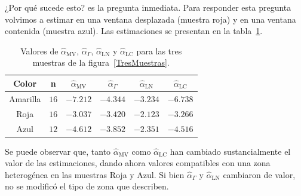 ¿Por qué sucede esto? es la pregunta inmediata. Para responder esta pregunta volvimos a estimar en una ventana desplazada (muestra roja) y en una ventana contenida (muestra azul). Las estimaciones se presentan en la tabla~\ref{TablaTresMuestras}.

\begin{table}[htb]
	\centering
	\caption{\label{TablaTresMuestras} Valores de $\widehat{\alpha}_{\text{MV}}$, $\widehat{\alpha}_{\Gamma}$, $\widehat{\alpha}_{\text{LN}}$ y $\widehat{\alpha}_{\text{LC}}$ para las tres muestras de la figura~\ref{TresMuestras}.}
	\begin{tabular}{c*5{c}}
		\toprule
		Color       &  n    &  $\widehat{\alpha}_{\text{MV}}$    &  $\widehat{\alpha}_{\Gamma}$  &  $\widehat{\alpha}_{\text{LN}}$ &  $\widehat{\alpha}_{\text{LC}}$\\
		\midrule
		Amarilla    & $16$  & $-7.212$ & $-4.344$ & $-3.234$ & $-6.738$\\
		Roja        & $16$  & $-3.037$ & $-3.420$ & $-2.123$ & $-3.266$\\
		Azul        & $12$  & $-4.612$ & $-3.852$ & $-2.351$ & $-4.516$\\
		\bottomrule
	\end{tabular}
\end{table}

Se puede observar que, tanto $\widehat{\alpha}_{\text{MV}}$ como $\widehat{\alpha}_{\text{LC}}$ han cambiado sustancialmente el valor de las estimaciones, dando ahora valores compatibles con una zona heterogénea en las muestras Roja y Azul. Si bien $\widehat{\alpha}_{\Gamma}$ y $\widehat{\alpha}_{\text{LN}}$ cambiaron de valor, no se modificó el tipo de zona que describen. 

